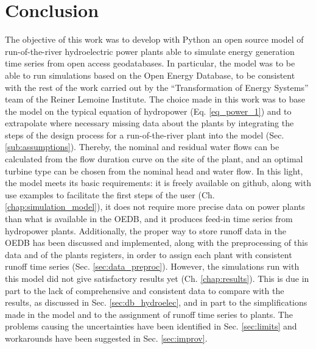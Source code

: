 \chapter{Conclusion}

The objective of this work was to develop with Python an open source model of run-of-the-river hydroelectric power plants able to simulate energy generation time series from open access geodatabases. In particular, the model was to be able to run simulations based on the Open Energy Database, to be consistent with the rest of the work carried out by the ``Transformation of Energy Systems'' team of the Reiner Lemoine Institute. \newline
The choice made in this work was to base the model on the typical equation of hydropower (Eq. \eqref{eq_power_1}) and to extrapolate where necessary missing data about the plants by integrating the steps of the design process for a run-of-the-river plant into the model (Sec. \ref{sub:assumptions}). Thereby, the nominal and residual water flows can be calculated from the flow duration curve on the site of the plant, and an optimal turbine type can be chosen from the nominal head and water flow. In this light, the model meets its basic requirements: it is freely available on github, along with use examples to facilitate the first steps of the user (Ch. \ref{chap:simulation_model}), it does not require more precise data on power plants than what is available in the OEDB, and it produces feed-in time series from hydropower plants. Additionally, the proper way to store runoff data in the OEDB has been discussed and implemented, along with the preprocessing of this data and of the plants registers, in order to assign each plant with consistent runoff time series (Sec. \ref{sec:data_preproc}). \newline
However, the simulations run with this model did not give satisfactory results yet (Ch. \ref{chap:results}). This is due in part to the lack of comprehensive and consistent data to compare with the results, as discussed in Sec. \ref{sec:db_hydroelec}, and in part to the simplifications made in the model and to the assignment of runoff time series to plants. The problems causing the uncertainties have been identified in Sec. \ref{sec:limits} and workarounds have been suggested in Sec. \ref{sec:improv}. \\ 


